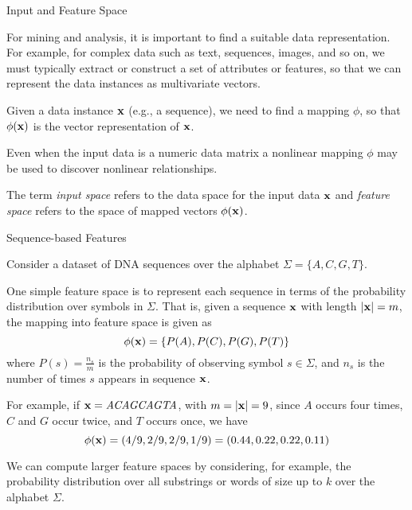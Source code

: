 
\date{Chapter 5: Kernel Methods}

\begin{frame}
\titlepage
\end{frame}


\begin{frame}{Input and Feature Space}

For mining and analysis, it is important to f\/{i}nd a suitable data
representation.  
For example, for complex
data such as text, sequences, images, and so on, we must typically extract
or construct a set of attributes or features, so that we can represent
the data instances as multivariate vectors.  

\medskip
Given a data
instance $\mathbf{x}$ (e.g., a sequence), we need to f\/{i}nd a mapping $\phi$, so
that $\phi(\mathbf{x})$ is the vector representation of $\mathbf{x}$.  

\medskip
Even when 
the input data is a numeric data matrix
a nonlinear mapping $\phi$ may be used to 
discover nonlinear relationships.

\medskip
The term {\em input space} refers to the data space for the input data
$\mathbf{x}$ and {\em feature space} refers to the space of mapped vectors $\phi(\mathbf{x})$.
\end{frame}



\begin{frame}{Sequence-based Features}

  Consider a dataset of DNA sequences over the alphabet $\Sigma =
\{A,C,G,T\}$. 

\medskip
One simple feature space is to represent each sequence in
terms of the probability distribution over symbols in $\Sigma$. That is,
given a sequence $\mathbf{x}$ with length $|\mathbf{x}| = m$, the mapping into feature
space is given as
$$\phi(\mathbf{x}) = \{P(A), P(C), P(G), P(T) \}$$
where
$P(s) = \tfrac{n_s}{m}$
is the probability of observing symbol $s\in\Sigma$,
and $n_s$ is the number of
times $s$ appears in sequence $\mathbf{x}$. 

\medskip
For example, if $\mathbf{x} = \hbox{\it ACAGCAGTA}$, with $m=|\mathbf{x}|=9$, since $A$ occurs four
times, $C$ and $G$ occur twice, and $T$ occurs once, we have
$$\phi(\mathbf{x})
= (4/9, 2/9, 2/9, 1/9)= (0.44,0.22,0.22,0.11)$$

\medskip
We can compute larger feature spaces by considering, for example, the
probability distribution over all substrings or words of size up to $k$
over the alphabet $\Sigma$.

\end{frame}


